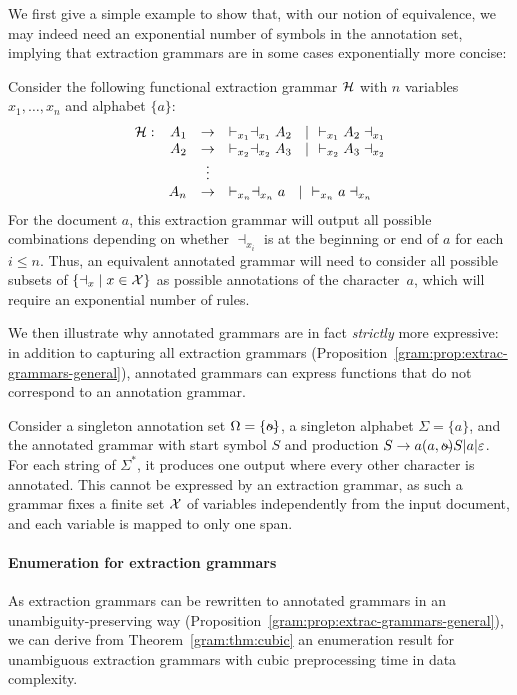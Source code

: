 We first give a simple example to show that, with our notion of equivalence,
we may indeed need an exponential number of symbols in the annotation set, implying that extraction grammars are in some cases exponentially more concise:

%
\begin{example}
Consider the following functional extraction grammar $\mathcal{H}$ with $n$ variables $x_1, \ldots, x_n$ and alphabet $\{a\}$:
  \[
\begin{array}{rrcl}
	\cH: & A_1 & \rightarrow &  \vdash_{x_1} \dashv_{x_1} A_2 \ \ \mid \ \ \vdash_{x_1} A_2 \dashv_{x_1} \\
	&  A_2 & \rightarrow &  \vdash_{x_2} \dashv_{x_2} A_3 \ \ \mid \ \ \vdash_{x_2} A_3 \dashv_{x_2} \\
	&  & \vdots & \\
	&  A_{n} & \rightarrow &  \vdash_{x_n} \dashv_{x_n} a \ \ \mid  \ \ \vdash_{x_n} a \dashv_{x_n} \\
\end{array}
\]
For the document $a$, this extraction grammar will output all possible combinations depending on whether $\dashv_{x_i}$ is at the beginning or end of $a$ for each $i \leq n$. Thus, an equivalent annotated grammar will need to consider all possible subsets of $\{ {\dashv_x} \mid x\in \mathcal{X}\}$ as possible annotations of the character~$a$, which will require an exponential number of rules.
\end{example}

We then illustrate why annotated grammars are in fact \emph{strictly} more
expressive: in addition to capturing all extraction grammars
(Proposition~\ref{gram:prop:extrac-grammars-general}),
annotated grammars can express functions that do not correspond to an annotation grammar.

%
\begin{example}
  Consider a singleton annotation set $\Omega = \{\oout\}$, a singleton alphabet $\Sigma = \{a\}$, and the annotated grammar with start symbol $S$ and production $S \rightarrow a (a, \oout) S | a | \epsilon$. For each string of $\Sigma^*$, it produces one output where every other character is annotated. This cannot be expressed by an extraction grammar, as such a grammar fixes a finite set $\mathcal{X}$ of variables independently from the input document, and each variable is mapped to only one span.
\end{example}


\paragraph{Enumeration for extraction grammars}
As extraction grammars can be rewritten to annotated grammars in an unambiguity-preserving way (Proposition~\ref{gram:prop:extrac-grammars-general}), we can derive from
Theorem~\ref{gram:thm:cubic} an enumeration result for unambiguous extraction grammars with cubic preprocessing time in data complexity.

